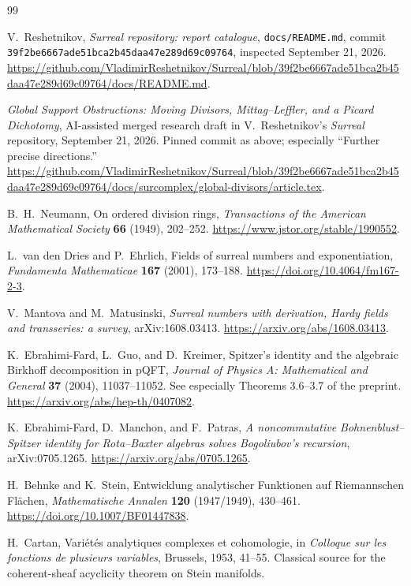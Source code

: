 \documentclass[11pt,letterpaper]{article}
\theoremstyle{definition}
\theoremstyle{remark}
\numberwithin{equation}{section}
\begin{document}
\begin{thebibliography}{99}
\small\raggedright
\setlength{\itemsep}{0.3em}

V.~Reshetnikov, \emph{Surreal repository: report catalogue},
\texttt{docs/README.md}, commit
\texttt{39f2be6667ade51bca2b45daa47e289d69c09764}, inspected September 21, 2026.
\url{https://github.com/VladimirReshetnikov/Surreal/blob/39f2be6667ade51bca2b45daa47e289d69c09764/docs/README.md}.

\emph{Global Support Obstructions: Moving Divisors, Mittag--Leffler, and a Picard Dichotomy}, AI-assisted merged research draft in V.~Reshetnikov's \emph{Surreal} repository, September 21, 2026. Pinned commit as above; especially ``Further precise directions.''
\url{https://github.com/VladimirReshetnikov/Surreal/blob/39f2be6667ade51bca2b45daa47e289d69c09764/docs/surcomplex/global-divisors/article.tex}.

B.~H.~Neumann, On ordered division rings,
\emph{Transactions of the American Mathematical Society} \textbf{66} (1949), 202--252.
\url{https://www.jstor.org/stable/1990552}.

L.~van den Dries and P.~Ehrlich, Fields of surreal numbers and exponentiation,
\emph{Fundamenta Mathematicae} \textbf{167} (2001), 173--188.
\url{https://doi.org/10.4064/fm167-2-3}.

V.~Mantova and M.~Matusinski,
\emph{Surreal numbers with derivation, Hardy fields and transseries: a survey}, arXiv:1608.03413.
\url{https://arxiv.org/abs/1608.03413}.

K.~Ebrahimi-Fard, L.~Guo, and D.~Kreimer,
Spitzer's identity and the algebraic Birkhoff decomposition in pQFT,
\emph{Journal of Physics A: Mathematical and General} \textbf{37} (2004), 11037--11052. See especially Theorems 3.6--3.7 of the preprint.
\url{https://arxiv.org/abs/hep-th/0407082}.

K.~Ebrahimi-Fard, D.~Manchon, and F.~Patras,
\emph{A noncommutative Bohnenblust--Spitzer identity for Rota--Baxter algebras solves Bogoliubov's recursion}, arXiv:0705.1265.
\url{https://arxiv.org/abs/0705.1265}.

H.~Behnke and K.~Stein, Entwicklung analytischer Funktionen auf Riemannschen Fl\"achen,
\emph{Mathematische Annalen} \textbf{120} (1947/1949), 430--461.
\url{https://doi.org/10.1007/BF01447838}.

H.~Cartan, Vari\'et\'es analytiques complexes et cohomologie,
in \emph{Colloque sur les fonctions de plusieurs variables}, Brussels, 1953, 41--55. Classical source for the coherent-sheaf acyclicity theorem on Stein manifolds.


\end{thebibliography}
\end{document}
